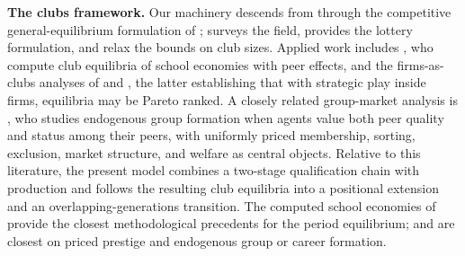 \documentclass[12pt,letterpaper]{article}
\theoremstyle{definition}
\begin{document}
\textbf{The clubs framework.}
Our machinery descends from \citet{buchanan1965clubs} through the competitive general-equilibrium formulation of \citet{ellickson1999clubs,ellickson2001clubs,ellickson2006organization}; \citet{scotchmer2002clubs} surveys the field, \citet{coleprescott1997valuation} provides the lottery formulation, and \citet{allouchwooders2008} relax the bounds on club sizes.
Applied work includes \citet{caucutt2001peer,caucutt2002vouchers}, who compute club equilibria of school economies with peer effects, and the firms-as-clubs analyses of \citet{prescotttownsend2006firms} and \citet{zame2007incentives}, the latter establishing that with strategic play inside firms, equilibria may be Pareto ranked.
A closely related group-market analysis is \citet{staab2024groups}, who studies endogenous group formation when agents value both peer quality and status among their peers, with uniformly priced membership, sorting, exclusion, market structure, and welfare as central objects.
Relative to this literature, the present model combines a two-stage qualification chain with production and follows the resulting club equilibria into a positional extension and an overlapping-generations transition.
The computed school economies of \citet{caucutt2001peer,caucutt2002vouchers} provide the closest methodological precedents for the period equilibrium; \citet{ferreiranikolowa2024} and \citet{staab2024groups} are closest on priced prestige and endogenous group or career formation.
\end{document}
